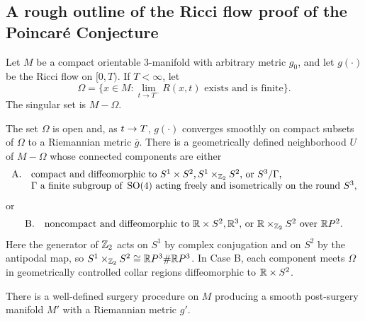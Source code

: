 \subsection{A rough outline of the Ricci flow proof of the Poincar\'e
Conjecture}

Let $M$ be a compact orientable $3$-manifold with arbitrary metric $g_0$, and
let $g(\cdot)$ be the Ricci flow on $[0,T)$.  If $T<\infty$, let
\[
\Omega=\{x\in M:\lim_{t\rightarrow T^-}R(x,t)\text{ exists and is finite}\}.
\]
The singular set is $M-\Omega$.

\begin{proposition}
  \label{prop:kl-overview-ricci-flow-approach-manifold-geometrization-existence-riemannian-metrics}
 \cite{Perelman2} \label{introclaim1}
The set $\Omega$ is open and, as $t\rightarrow T$, $g(\cdot)$ converges smoothly on
compact subsets of $\Omega$ to a Riemannian metric $\overline g$.  There is a
geometrically defined neighborhood $U$ of $M-\Omega$ whose connected
components are either
\[
\begin{array}{ll}
\mathrm{A}.&\text{compact and diffeomorphic to }S^1\times S^2,
S^1\times_{{\mathbb Z}_2}S^2\text{, or }S^3/\Gamma,\\
&\Gamma\text{ a finite subgroup of }\operatorname{SO}(4)\text{ acting freely and
isometrically on the round }S^3,
\end{array}
\]
or
\[
\begin{array}{ll}
\mathrm{B}.&\text{noncompact and diffeomorphic to }{\mathbb R}\times S^2,
{\mathbb R}^3\text{, or }{\mathbb R}\times_{{\mathbb Z}_2}S^2\text{ over }{\mathbb R} P^2.
\end{array}
\]
Here the generator of ${\mathbb Z}_2$ acts on $S^1$ by complex conjugation and on
$S^2$ by the antipodal map, so
$S^1\times_{{\mathbb Z}_2}S^2\cong{\mathbb R} P^3\#{\mathbb R} P^3$.  In Case B, each component
meets $\Omega$ in geometrically controlled collar regions diffeomorphic to
${\mathbb R}\times S^2$.
\end{proposition}

\begin{proposition}
  \label{prop:kl-overview-ricci-flow-approach-manifold-geometrization-existence-ricci-flow-surgery}
 \cite{Perelman2} \label{introclaim2}
There is a well-defined surgery procedure on $M$ producing a smooth
post-surgery manifold $M'$ with a Riemannian metric $g'$.
\end{proposition}

